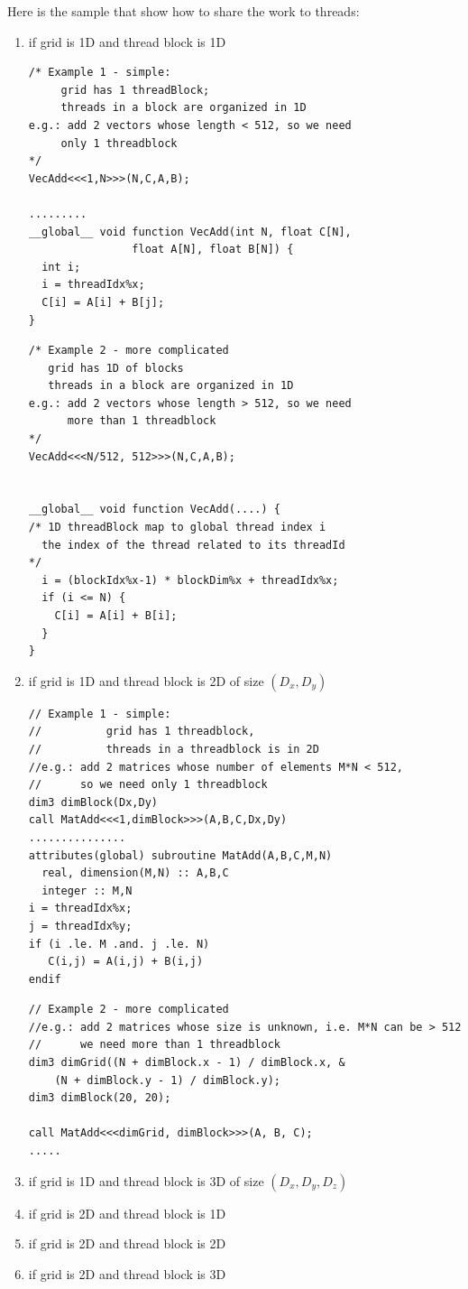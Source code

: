 Here is the sample that show how to share the work to threads:
\begin{enumerate}
\item if grid is 1D and thread block is 1D
\begin{lstlisting}
/* Example 1 - simple: 
     grid has 1 threadBlock;
     threads in a block are organized in 1D
e.g.: add 2 vectors whose length < 512, so we need 
     only 1 threadblock
*/
VecAdd<<<1,N>>>(N,C,A,B);

.........
__global__ void function VecAdd(int N, float C[N],
                float A[N], float B[N]) {
  int i;
  i = threadIdx%x;
  C[i] = A[i] + B[j];
}
\end{lstlisting}
\begin{lstlisting}
/* Example 2 - more complicated
   grid has 1D of blocks
   threads in a block are organized in 1D
e.g.: add 2 vectors whose length > 512, so we need 
      more than 1 threadblock
*/
VecAdd<<<N/512, 512>>>(N,C,A,B);


__global__ void function VecAdd(....) {
/* 1D threadBlock map to global thread index i
  the index of the thread related to its threadId
*/
  i = (blockIdx%x-1) * blockDim%x + threadIdx%x;
  if (i <= N) {
    C[i] = A[i] + B[i];
  }
}
\end{lstlisting}

\item if grid is 1D and thread block is 2D of size $(D_x,D_y)$
\begin{lstlisting}
// Example 1 - simple:
//          grid has 1 threadblock, 
//          threads in a threadblock is in 2D
//e.g.: add 2 matrices whose number of elements M*N < 512, 
//      so we need only 1 threadblock
dim3 dimBlock(Dx,Dy) 
call MatAdd<<<1,dimBlock>>>(A,B,C,Dx,Dy)
...............
attributes(global) subroutine MatAdd(A,B,C,M,N)
  real, dimension(M,N) :: A,B,C
  integer :: M,N
i = threadIdx%x;
j = threadIdx%y;
if (i .le. M .and. j .le. N)
   C(i,j) = A(i,j) + B(i,j)
endif
\end{lstlisting}

\begin{lstlisting}
// Example 2 - more complicated
//e.g.: add 2 matrices whose size is unknown, i.e. M*N can be > 512
//      we need more than 1 threadblock
dim3 dimGrid((N + dimBlock.x - 1) / dimBlock.x, &
    (N + dimBlock.y - 1) / dimBlock.y);
dim3 dimBlock(20, 20);

call MatAdd<<<dimGrid, dimBlock>>>(A, B, C);
.....

\end{lstlisting}

\item if grid is 1D and thread block is 3D of size $(D_x,D_y,D_z)$
\item if grid is 2D and thread block is 1D
\item if grid is 2D and thread block is 2D
\item if grid is 2D and thread block is 3D
\end{enumerate}


